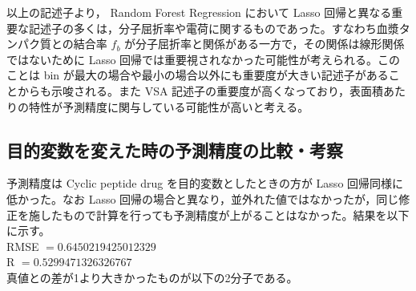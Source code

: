 \documentclass[a4j,11pt]{jarticle}
\begin{document}
以上の記述子より， Random Forest Regression において Lasso 回帰と異なる重要な記述子の多くは，分子屈折率や電荷に関するものであった。すなわち血漿タンパク質との結合率 $f_b$ が分子屈折率と関係がある一方で，その関係は線形関係ではないために Lasso 回帰では重要視されなかった可能性が考えられる。このことは bin が最大の場合や最小の場合以外にも重要度が大きい記述子があることからも示唆される。また VSA 記述子の重要度が高くなっており，表面積あたりの特性が予測精度に関与している可能性が高いと考える。

\subsection{目的変数を変えた時の予測精度の比較・考察}
予測精度は Cyclic peptide drug を目的変数としたときの方が Lasso 回帰同様に低かった。なお Lasso 回帰の場合と異なり，並外れた値ではなかったが，同じ修正を施したもので計算を行っても予測精度が上がることはなかった。結果を以下に示す。\\
\linebreak
RMSE $= 0.6450219425012329$\\
R $= 0.5299471326326767$ \\

真値との差が1より大きかったものが以下の2分子である。\\
\end{document}
